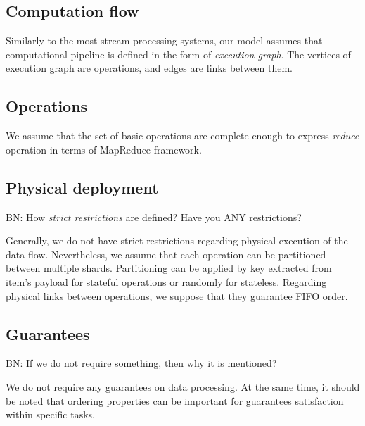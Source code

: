 \subsection{Computation flow}
Similarly to the most stream processing systems, our model assumes that computational pipeline is defined in the form of {\it execution graph}. The vertices of execution graph are operations, and edges are links between them. 

\subsection{Operations}
We assume that the set of basic operations are complete enough to express {\it reduce} operation in terms of MapReduce framework.

\subsection{Physical deployment}

BN: How {\em strict restrictions} are defined? Have you ANY restrictions?

Generally, we do not have strict restrictions regarding physical execution of the data flow.  
Nevertheless, we assume that each operation can be partitioned between multiple shards. Partitioning can be applied by key extracted from item's payload for stateful operations or randomly for stateless. Regarding physical links between operations, we suppose that they guarantee FIFO order.

\subsection{Guarantees}

BN: If we do not require something, then why it is mentioned? 

We do not require any guarantees on data processing. At the same time, it should be noted that ordering properties can be important for guarantees satisfaction within specific tasks.